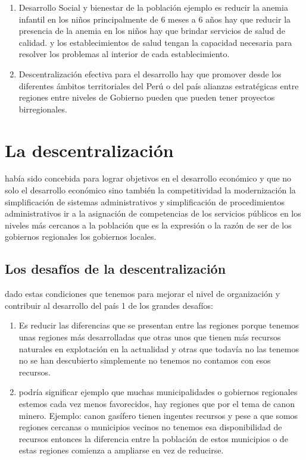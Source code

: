\documentclass[
  letterpaper,
  DIV=11,
  numbers=noendperiod]{scrartcl}
\begin{document}
\begin{enumerate}
\def\labelenumi{\arabic{enumi}.}
\setcounter{enumi}{3}
\item
  Desarrollo Social y bienestar de la población ejemplo es reducir la
  anemia infantil en los niños principalmente de 6 meses a 6 años hay
  que reducir la presencia de la anemia en los niños hay que brindar
  servicios de salud de calidad. y los establecimientos de salud tengan
  la capacidad necesaria para resolver los problemas al interior de cada
  establecimiento.
\item
  Descentralización efectiva para el desarrollo hay que promover desde
  los diferentes ámbitos territoriales del Perú o del país alianzas
  estratégicas entre regiones entre niveles de Gobierno pueden que
  pueden tener proyectos birregionales.
\end{enumerate}

\hypertarget{la-descentralizaciuxf3n}{%
\section{La descentralización}\label{la-descentralizaciuxf3n}}

había sido concebida para lograr objetivos en el desarrollo económico y
que no solo el desarrollo económico sino también la competitividad la
modernización la simplificación de sistemas administrativos y
simplificación de procedimientos administrativos ir a la asignación de
competencias de los servicios públicos en los niveles más cercanos a la
población que es la expresión o la razón de ser de los gobiernos
regionales los gobiernos locales.

\hypertarget{los-desafuxedos-de-la-descentralizaciuxf3n}{%
\subsection{Los desafíos de la
descentralización}\label{los-desafuxedos-de-la-descentralizaciuxf3n}}

dado estas condiciones que tenemos para mejorar el nivel de organización
y contribuir al desarrollo del país 1 de los grandes desafíos:

\begin{enumerate}
\def\labelenumi{\arabic{enumi}.}
\item
  Es reducir las diferencias que se presentan entre las regiones porque
  tenemos unas regiones más desarrolladas que otras unos que tienen más
  recursos naturales en explotación en la actualidad y otras que todavía
  no las tenemos no se han descubierto simplemente no tenemos no
  contamos con esos recursos.
\item
  podría significar ejemplo que muchas municipalidades o gobiernos
  regionales estemos cada vez menos favorecidos, hay regiones que por el
  tema de canon minero. Ejemplo: canon gasífero tienen ingentes recursos
  y pese a que somos regiones cercanas o municipios vecinos no tenemos
  esa disponibilidad de recursos entonces la diferencia entre la
  población de estos municipios o de estas regiones comienza a ampliarse
  en vez de reducirse.
\end{enumerate}
\end{document}
